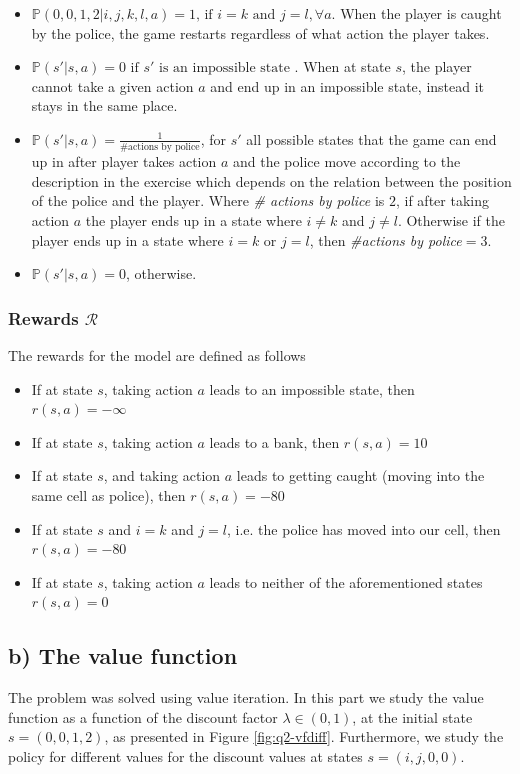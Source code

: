 \documentclass{article}
\begin{document}
\begin{itemize}
  \item $\mathbb{P}(0,0,1,2|i,j,k,l,a)=1 \textrm{, if } i=k \textrm{ and } j=l, \forall a$. When the player is caught by the police, the game restarts regardless of what action the player takes.
  \item $\mathbb{P}(s'|s,a)=0 \textrm{ if } s' \textrm{ is an impossible state }$. When at state $s$, the player cannot take a given action $a$ and end up in an impossible state, instead it stays in the same place.
  \item $\mathbb{P}(s'|s,a)=\frac{1}{\# \textrm{actions by police}}$, for $s'$ all possible states that the game can end up in after player takes action $a$ and the police move according to the description in the exercise which depends on the relation between the position of the police and the player. Where \textit{\# actions by police} is $2$, if after taking action $a$ the  player ends up in a state where $i \neq k$ and $j \neq l$. Otherwise if the player ends up in a state where $i=k$ or $j=l$, then \textit{#actions by police}$=3$.
  \item $\mathbb{P}(s'|s,a)=0$, otherwise.
\end{itemize}

\subsubsection{Rewards $\mathcal{R}$}
The rewards for the model are defined as follows 
\begin{itemize}
    \item If at state $s$, taking action $a$ leads to an impossible state, then $r(s,a) = -\infty$
    \item If at state $s$, taking action $a$ leads to a bank, then  $ r(s,a) = 10 $
    \item If at state $s$, and taking action $a$ leads to getting caught (moving into the same cell as police), then $r(s,a)=-80$  
    \item If at state $s$ and $i=k$ and $j=l$, i.e. the police has moved into our cell, then $r(s,a)=-80$  
    \item If at state $s$, taking action $a$ leads to neither of the aforementioned states $ r(s,a) = 0 $
\end{itemize}

\subsection{b) The value function}
The problem was solved using value iteration. In this part we study the value function as a function of the discount factor $\lambda \in (0,1)$, at the initial state $s=(0,0,1,2)$, as presented in Figure \ref{fig:q2-vfdiff}. Furthermore, we study the policy for different values for the discount values at states $s=(i,j,0,0)$.
\end{document}
